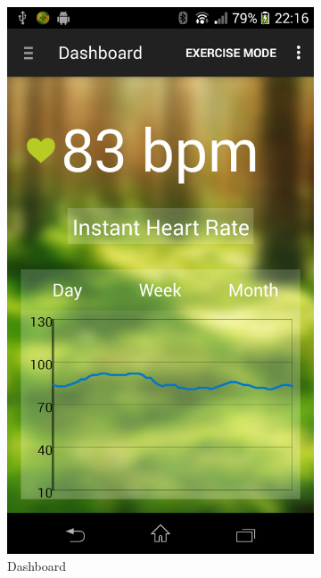 \begin{figure}
\centering
\begin{subfigure}{.24\textwidth}
  \centering
  \includegraphics[width=.8\linewidth]{img/screenshot/ss1.png}
  \caption{Dashboard}
\end{subfigure}%
\begin{subfigure}{.24\textwidth}
  \centering

\end{subfigure}
\end{figure}
